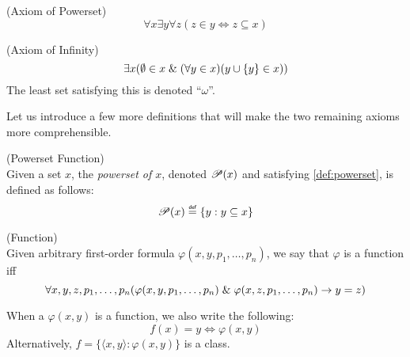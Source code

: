 \begin{definition}{(Axiom of Powerset)}\label{def:powerset}
\begin{equation}
\forall x \exists y \forall z (z \in y \iff z \subseteq x) %
\end{equation}
\end{definition}

\begin{definition}{(Axiom of Infinity)}\label{def:infinity} %
\begin{equation}
\exists x (\emptyset \in x \mathrel{\&} (\forall y \in x)(y\cup\{y\} \in x))
\end{equation}
The least set satisfying this is denoted ``$\omega$''.
\end{definition}

Let us introduce a few more definitions that will make the two remaining axioms more comprehensible.
\begin{definition}{(Powerset Function)}\\
Given a set $x$, the \emph{powerset of $x$}, denoted $\mathscr{P} (x)$ and satisfying \ref{def:powerset}, is defined as follows:
\begin{equation}
\power{x} \defeq \{y: y \subseteq x\}
\end{equation}
\end{definition}

\begin{definition}{(Function)}\label{def:function}\\
Given arbitrary first-order formula $\varphi(x, y, p_1, \ldots, p_n)$, we say that $\varphi$ is a function iff
\begin{equation}\label{def:function_formula}
\forall x, y, z, p_1, \ldots, p_n (\varphi(x, y, p_1, \ldots, p_n) \mathrel{\&} \varphi(x, z, p_1, \ldots, p_n) \rightarrow y = z)
\end{equation}
\end{definition}
When a $\varphi(x, y)$ is a function, we also write the following:
\begin{equation}
f(x) = y \iff \varphi(x, y)
\end{equation}
Alternatively, $f = \{\langle x, y \rangle : \varphi(x, y)\}$ is a class.

